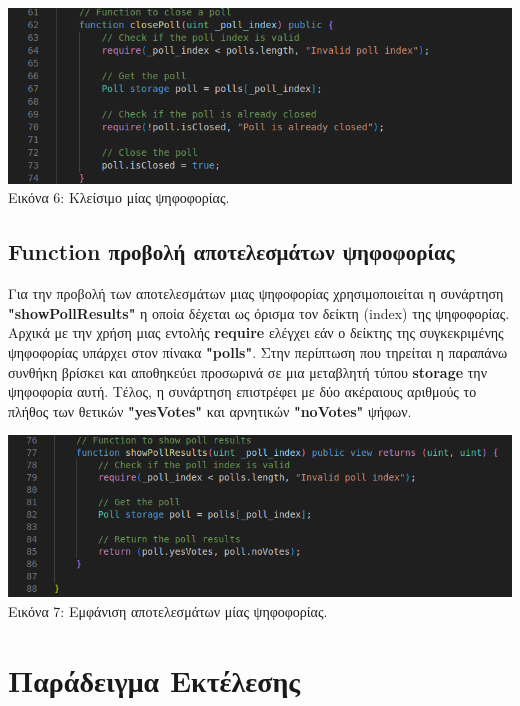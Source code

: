 \documentclass[12pt]{article}
\begin{document}
    \begin{center}
        \includegraphics[width=\linewidth, keepaspectratio]{images/code_close_poll.png}
        Εικόνα 6: Κλείσιμο μίας ψηφοφορίας.
    \end{center}
    
    \subsection{Function προβολή αποτελεσμάτων ψηφοφορίας}
        Για την προβολή των αποτελεσμάτων μιας ψηφοφορίας χρησιμοποιείται η συνάρτηση \textbf{"showPollResults"} η οποία δέχεται ως όρισμα τον δείκτη (index) της ψηφοφορίας. Αρχικά με την χρήση μιας εντολής \textbf{require} ελέγχει εάν ο δείκτης της συγκεκριμένης ψηφοφορίας υπάρχει στον πίνακα \textbf{"polls"}. Στην περίπτωση που τηρείται η παραπάνω συνθήκη βρίσκει και αποθηκεύει προσωρινά σε μια μεταβλητή τύπου \textbf{storage} την ψηφοφορία αυτή. Τέλος, η συνάρτηση επιστρέφει με δύο ακέραιους αριθμούς το πλήθος των θετικών \textbf{"yesVotes"} και αρνητικών \textbf{"noVotes"} ψήφων.

    \begin{center}
        \includegraphics[width=\linewidth, keepaspectratio]{images/code_show_poll_results.png}
        Εικόνα 7: Εμφάνιση αποτελεσμάτων μίας ψηφοφορίας.
    \end{center}
    
    \newpage
    
\section{Παράδειγμα Εκτέλεσης}
\end{document}
